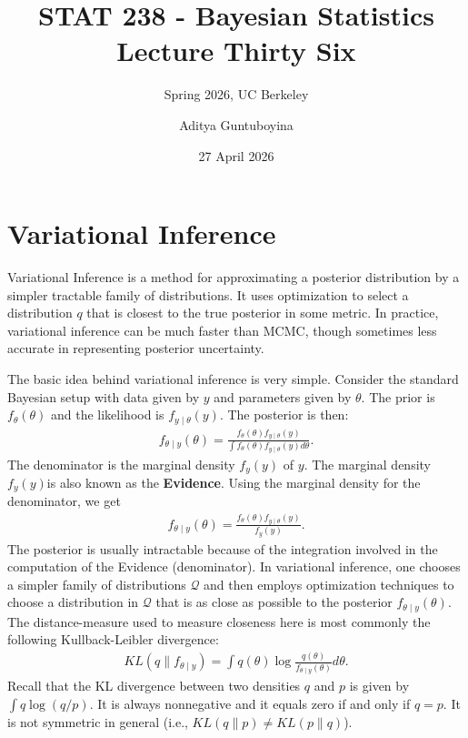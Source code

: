 \documentclass{scrartcl}
\newcommand{\Qcal}{{\mathcal{Q}}}
\begin{document}
\title{STAT 238 - Bayesian Statistics  \\
  Lecture Thirty Six} 
\subtitle{Spring 2026, UC Berkeley}

\author{Aditya Guntuboyina}


\date{27 April 2026}

\maketitle

\section{Variational Inference}

Variational Inference is a method for approximating a posterior
distribution by a simpler tractable family of distributions. It uses
optimization to select a distribution $q$ that is closest to the true
posterior in some metric. In practice, variational inference can be
much faster than MCMC, though sometimes less accurate in representing
posterior uncertainty.

The basic idea behind variational inference is very simple. Consider
the standard Bayesian setup with data given by $y$ and parameters
given by $\theta$. The prior is $f_{\theta}(\theta)$ and the
likelihood is $f_{y \mid \theta}(y)$. The posterior is then:
\begin{align*}
  f_{\theta \mid y}(\theta) = \frac{f_{\theta}(\theta) f_{y \mid
  \theta}(y)}{\int f_{\theta}(\theta) f_{y \mid \theta}(y) d\theta}. 
\end{align*}
The denominator is the marginal density $f_{y}(y)$ of $y$. The
marginal density $f_{y}(y)$is also known as the
\textbf{Evidence}. Using the marginal density for the denominator, we
get
\begin{align*}
    f_{\theta \mid y}(\theta) = \frac{f_{\theta}(\theta) f_{y \mid
  \theta}(y)}{f_{y}(y)}. 
\end{align*}
The posterior is usually intractable because of the integration
involved in the computation of the Evidence (denominator). In
variational inference, one chooses a simpler family of distributions
$\Qcal$ and then employs optimization techniques to choose a
distribution in $\Qcal$ that is as close as possible to the 
posterior $f_{\theta \mid y}(\theta)$. The distance-measure used to
measure closeness here is most commonly the following Kullback-Leibler
divergence:
\begin{align*}
  KL(q \| f_{\theta \mid y}) = \int q(\theta) \log
  \frac{q(\theta)}{f_{\theta \mid y}(\theta)} d\theta. 
\end{align*}
Recall that the KL divergence between two densities $q$ and $p$ is
given by $\int q \log (q/p)$. It is always nonnegative and it equals
zero if and only if $q = p$. It is not symmetric in general (i.e.,
$KL(q \| p) \neq KL(p \| q)$).
\end{document}
